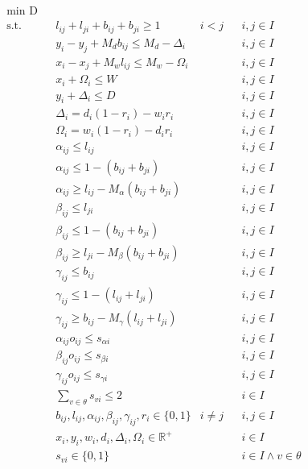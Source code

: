 \begin{align}
	& \underset{}{\text{min D}} \label{equaDD}\\
	& \text{s.t.} & &  l_{ij} + l_{ji} + b_{ij} + b_{ji} \geq 1 & i < j && i,j \in I \label{equa30}\\
	& & & y_i - y_j + M_d b_{ij} \leq M_d - \Delta_i & & & i,j \in I \label{equa31}\\
	& & & x_i - x_j + M_w l_{ij} \leq M_w - \Omega_i & & & i,j \in I \label{equa32}\\
	& & & x_i + \Omega_i \leq W & & & i,j \in I \label{equa33}\\
	& & & y_i + \Delta_i \leq D & & & i,j \in I \label{equa34}\\
	& & & \Delta_i = d_i (1 - r_i) - w_i r_i &      &   & i,j \in I \label{equa35}\\
	& & & \Omega_i = w_i (1 - r_i) - d_i r_i &      &   & i,j \in I \label{equa36}\\
	&   &   & \alpha_{ij} \leq l_{ij}                             &   &   & i,j \in I \label{equa37} \\
	&   &   & \alpha_{ij} \leq 1 - (b_{ij} + b_{ji})              &   &   & i,j \in I \label{equa38} \\
	&   &   & \alpha_{ij} \geq l_{ij} - M_\alpha(b_{ij} + b_{ji}) &   &   & i,j \in I \label{equa39} \\
	&   &   & \beta_{ij} \leq l_{ji}                              &   &   & i,j \in I \label{equa40} \\
	&   &   & \beta_{ij} \leq 1 - (b_{ij} + b_{ji})               &   &   & i,j \in I \label{equa41} \\
	&   &   & \beta_{ij} \geq l_{ji} - M_\beta(b_{ij} + b_{ji})   &   &   & i,j \in I \label{equa42} \\
	&   &   & \gamma_{ij} \leq b_{ij}                             &   &   & i,j \in I \label{equa43} \\
	&   &   & \gamma_{ij} \leq 1 - (l_{ij} + l_{ji})              &   &   & i,j \in I \label{equa44} \\
	&   &   & \gamma_{ij} \geq b_{ij} - M_\gamma(l_{ij} + l_{ji}) &   &   & i,j \in I \label{equa45} \\
	& & & \alpha_{ij}o_{ij} \leq s_{\alpha i}  & & & i,j \in I \label{equa46}\\
	& & & \beta_{ij}o_{ij} \leq s_{\beta i}  & & & i,j \in I \label{equa47}\\
	& & & \gamma_{ij}o_{ij} \leq s_{\gamma i}  & & & i,j \in I \label{equa48}\\
	  &   &   & \sum_{v \in \theta} s_{vi} \leq 2                                     &          &   & i \in I   &   & \label{equa49} \\
	  &   &   & b_{ij}, l_{ij}, \alpha_{ij}, \beta_{ij}, \gamma_{ij}, r_i \in \{0,1\} & i \neq j &   & i,j \in I &   & \label{equa50} \\
	&             &   & x_{i}, y_{i}, w_{i}, d_{i}, \Delta_{i}, \Omega_{i} \in \mathbb{R}^{+} &          &   & i \in I  \label{equa51}\\
	&   &   & s_{vi} \in \{0,1\} &   &   & i \in I \land v\in \theta \label{equa52} 
\end{align}

